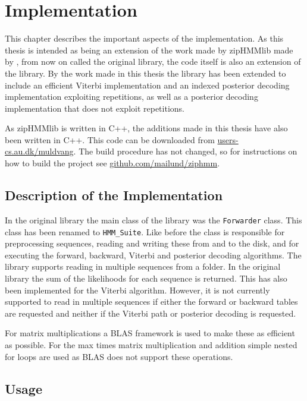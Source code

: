 
\chapter{Implementation}
\label{cha:implementation}

This chapter describes the important aspects of the implementation.  As this
thesis is intended as being an extension of the work made by zipHMMlib made by
\citet{sand2013ziphmmlib}, from now on called the original library, the code
itself is also an extension of the library.  By the work made in this thesis
the library has been extended to include an efficient Viterbi implementation
and an indexed posterior decoding implementation exploiting repetitions, as well
as a posterior decoding implementation that does not exploit repetitions.

As zipHMMlib is written in C++, the additions made in this thesis have also been
written in C++.  This code can be downloaded from
\url{users-cs.au.dk/muldvang}.   The build procedure has not
changed, so for instructions on how to build the project see
\url{github.com/mailund/ziphmm}.

\section{Description of the Implementation}

In the original library the main class of the library was the
\texttt{Forwarder} class.  This class has been renamed to \texttt{HMM\_Suite}.
Like before the class is responsible for preprocessing sequences, reading and
writing these from and to the disk, and for executing the forward, backward,
Viterbi and posterior decoding algorithms.  The library supports reading in
multiple sequences from a folder.  In the original library the sum of the
likelihoods for each sequence is returned.  This has also been implemented for
the Viterbi algorithm.  However, it is not currently supported to read in
multiple sequences if either the forward or backward tables are requested and
neither if the Viterbi path or posterior decoding is requested.

For matrix multiplications a BLAS framework is used to make these as efficient
as possible.  For the max times matrix multiplication and addition simple nested
for loops are used as BLAS does not support these operations.

\section{Usage}

